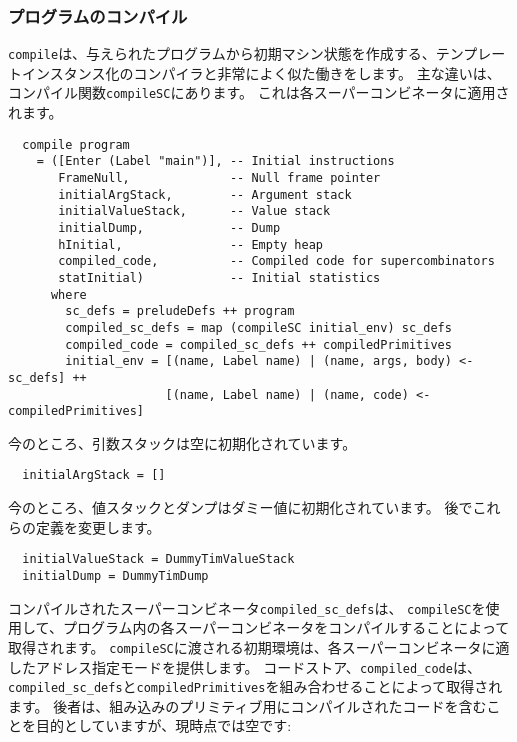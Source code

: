 \documentclass{jarticle}
\begin{document}
\subsubsection{プログラムのコンパイル}

\texttt{compile}は、与えられたプログラムから初期マシン状態を作成する、テンプレートインスタンス化のコンパイラと非常によく似た働きをします。
主な違いは、コンパイル関数\texttt{compileSC}にあります。
これは各スーパーコンビネータに適用されます。

\begin{verbatim}
  compile program
    = ([Enter (Label "main")], -- Initial instructions
       FrameNull,              -- Null frame pointer
       initialArgStack,        -- Argument stack
       initialValueStack,      -- Value stack
       initialDump,            -- Dump
       hInitial,               -- Empty heap
       compiled_code,          -- Compiled code for supercombinators
       statInitial)            -- Initial statistics
      where
        sc_defs = preludeDefs ++ program
        compiled_sc_defs = map (compileSC initial_env) sc_defs
        compiled_code = compiled_sc_defs ++ compiledPrimitives
        initial_env = [(name, Label name) | (name, args, body) <- sc_defs] ++
                      [(name, Label name) | (name, code) <- compiledPrimitives]
\end{verbatim}

今のところ、引数スタックは空に初期化されています。

\begin{verbatim}
  initialArgStack = []
\end{verbatim}

今のところ、値スタックとダンプはダミー値に初期化されています。
後でこれらの定義を変更します。

\begin{verbatim}
  initialValueStack = DummyTimValueStack
  initialDump = DummyTimDump
\end{verbatim}

コンパイルされたスーパーコンビネータ\texttt{compiled\_sc\_defs}は、
\texttt{compileSC}を使用して、プログラム内の各スーパーコンビネータをコンパイルすることによって取得されます。
\texttt{compileSC}に渡される初期環境は、各スーパーコンビネータに適したアドレス指定モードを提供します。
コードストア、\texttt{compiled\_code}は、\texttt{compiled\_sc\_defs}と\texttt{compiledPrimitives}を組み合わせることによって取得されます。
後者は、組み込みのプリミティブ用にコンパイルされたコードを含むことを目的としていますが、現時点では空です:
\end{document}
